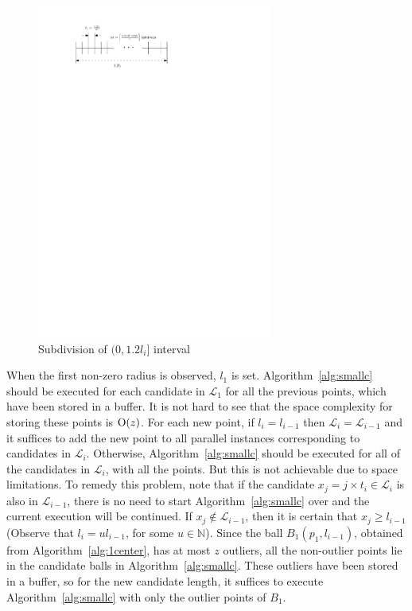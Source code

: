 \documentclass[envcountsame]{cls/cccg15}
\newcommand{\cO}{\ensuremath{{\rm O}}}
\newcommand{\gee}{\geqslant}
\renewcommand{\ge}{\gee}
\begin{document}
\begin{figure}[h]
	\centering
	\includegraphics[width=21em]{figs/findr}
	\caption{Subdivision of $(0, 1.2 l_i]$ interval}
	\label{fig:findr}
\end{figure}

When the first non-zero radius is observed, $l_1$ is set. Algorithm~\ref{alg:smallc} should be executed for each candidate in $\mathcal{L}_1$ for all the previous points, which have been stored in a buffer. It is not hard to see that the space complexity for storing these points is $\cO(z)$. For each new point, if $l_i=l_{i-1}$ then $\mathcal{L}_i = \mathcal{L}_{i-1}$ and it suffices to add the new point to all parallel instances corresponding to candidates in $\mathcal{L}_i$. Otherwise, Algorithm~\ref{alg:smallc} should be executed for all of the candidates in $\mathcal{L}_i$, with all the points. But this is not achievable due to space limitations. To remedy
this problem, note that if the candidate $x_j=j \times t_i \in \mathcal{L}_i$ is also in $\mathcal{L}_{i-1}$, there is no need to start Algorithm~\ref{alg:smallc} over and the current execution will be continued. If $x_j \notin \mathcal{L}_{i-1}$, then it is certain that $x_j \ge l_{i - 1}$ (Observe that $l_i=ul_{i-1}$, for some $u\in \mathbb{N}$). Since the ball $B_1(p_1, l_{i-1})$, obtained from Algorithm~\ref{alg:1center}, has at most $z$ outliers, all the non-outlier points lie in the candidate balls in Algorithm~\ref{alg:smallc}.
These outliers have been stored in a buffer, so for the new candidate length, it suffices to execute Algorithm~\ref{alg:smallc} with only the outlier points of $B_1$.
\end{document}
